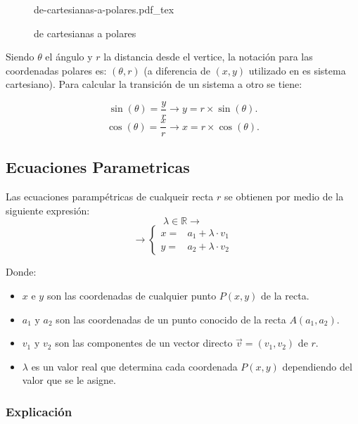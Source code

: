 \documentclass[a4paper]{book}
\newcommand{\incfig}[2][1]{%
    \def\svgwidth{#1\columnwidth}
    {#2.pdf_tex}
}
\begin{document}
\begin{figure}[ht]
    \centering
    \incfig[0.7]{de-cartesianas-a-polares}
    \caption{de cartesianas a polares}
    \label{fig:de-cartesianas-a-polares}
\end{figure}

Siendo \(\theta\) el ángulo y \(r\) la distancia desde el vertice, la notación
para las coordenadas polares es: \(\left( \theta,r \right)\) (a diferencia de
\(\left(x,y\right)\) utilizado en es sistema cartesiano). Para calcular la
transición de un sistema a otro se tiene:

\[
\sin\left(\theta\right)=\frac{y}{r}\to y=r\times \sin\left(\theta\right)
.\]
\[
\cos\left(\theta\right) = \frac{x}{r} \to x=r \times\cos\left(\theta\right)
.\]





\subsection{Ecuaciones Parametricas}
\label{ssec:ecuaciones_parametricas}

Las ecuaciones parampétricas de cualqueir recta \(r\) se obtienen por medio de
la siguiente expresión:
\[
\lambda \in \mathbb{R} \to
\]
\[
\to\left\{
    \begin{array}{ll}
        x=&a_1+\lambda \cdot v_1 \\
        y=&a_2+\lambda \cdot v_2
    \end{array}
\right
.\]

Donde:
\begin{itemize}
    \item \(x \text{ e } y\) son las coordenadas de cualquier punto
        \(P\left(x,y\right)\) de la recta.
    \item  \(a_1 \text{ y } a_2\) son las coordenadas de un punto conocido de
        la recta \(A\left(a_1,a_2\right)\).
    \item \(v_1 \text{ y }v_2\) son las componentes de un vector directo
        \(\overrightarrow{v}=\left( v_1,v_2\right)\) de \(r\).
    \item \(\lambda\) es un valor real que determina cada coordenada \(P\left(x,y\right)\) dependiendo del valor que se le asigne.

\end{itemize}

\subsubsection{Explicación}
\end{document}
